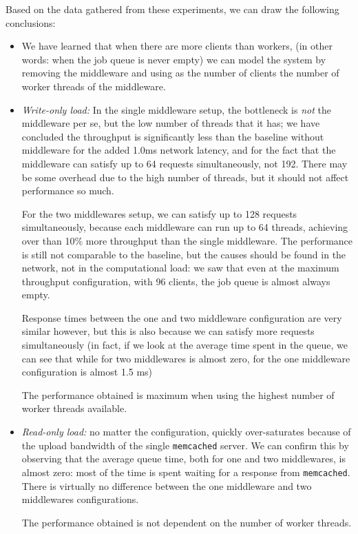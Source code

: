 \documentclass[11pt,a4paper]{article}
\renewcommand{\t}[1]{%
	{\texttt{#1}}}
\begin{document}
Based on the data gathered from these experiments, we can draw the following conclusions:
\begin{itemize}
	\item We have learned that when there are more clients than workers, (in
		other words: when the job queue is never empty) we can model the system
		by removing the middleware and using as the number of clients the
		number of worker threads of the middleware.

	\item \emph{Write-only load:} In the single middleware setup, the
		bottleneck is \emph{not} the middleware per se, but the low
		number of threads that it has; we have concluded the
		throughput is significantly less than the baseline without middleware
		for the added 1.0ms network latency, and for the fact that the
		middleware can satisfy up to 64 requests simultaneously, not 192.
		There may be some overhead due to the high number of threads, but
		it should not affect performance so much.

		For the two middlewares setup, we can satisfy up to 128 requests
		simultaneously, because each middleware can run up to 64 threads,
		achieving over than 10\% more throughput than the single middleware.
		The performance is still not comparable to the baseline, but the causes
		should be found in the network, not in the computational load:
		we saw that even at the maximum throughput configuration, with 96 clients, 
		the job queue is almost always empty.

		Response times between the one and two middleware configuration
		are very similar however, but this is also because we can satisfy
		more requests simultaneously (in fact, if we look at the average
		time spent in the queue, we can see that while for two middlewares is
		almost zero, for the one middleware configuration is almost 1.5 ms)

		The performance obtained is maximum when using the highest number
		of worker threads available.

	\item \emph{Read-only load:} no matter the configuration, quickly
		over-saturates because of the upload bandwidth of the single
		\t{memcached} server.  We can confirm this by observing that the
		average queue time, both for one and two middlewares, is almost zero:
		most of the time is spent waiting for a response from \t{memcached}.
		There is virtually no difference between the one middleware and two
		middlewares configurations.
		
		The performance obtained is not dependent on the number of worker threads.

\end{itemize}
\end{document}
